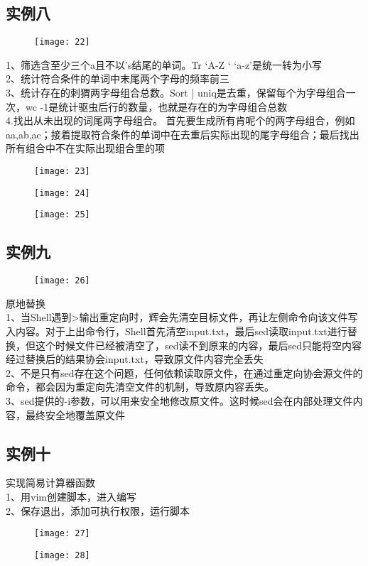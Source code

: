 \documentclass[12pt,letterpaper]{article}
\begin{document}
\subsection{实例八}
\begin{figure}[H]
\centering
\texttt{[image: 22]}
\end{figure}
1、筛选含至少三个a且不以’s结尾的单词。Tr ‘A-Z ‘ ‘a-z’是统一转为小写\\
2、统计符合条件的单词中末尾两个字母的频率前三\\
3、统计存在的刺猬两字母组合总数。Sort | uniq是去重，保留每个为字母组合一次，wc -1是统计驱虫后行的数量，也就是存在的为字母组合总数\\
4.找出从未出现的词尾两字母组合。
首先要生成所有肯呢个的两字母组合，例如aa,ab,ac；接着提取符合条件的单词中在去重后实际出现的尾字母组合；最后找出所有组合中不在实际出现组合里的项
\begin{figure}[H]
\centering
\texttt{[image: 23]}
\end{figure}
\vspace{-6mm}
\begin{figure}[H]
\centering
\texttt{[image: 24]}
\end{figure}
\vspace{-6mm}
\begin{figure}[H]
\centering
\texttt{[image: 25]}
\end{figure}

\subsection{实例九}
\begin{figure}[H]
\centering
\texttt{[image: 26]}
\end{figure}
原地替换\\
1、当Shell遇到>输出重定向时，辉会先清空目标文件，再让左侧命令向该文件写入内容。对于上出命令行，Shell首先清空input.txt，最后sed读取input.txt进行替换，但这个时候文件已经被清空了，sed读不到原来的内容，最后sed只能将空内容经过替换后的结果协会input.txt，导致原文件内容完全丢失\\
2、不是只有sed存在这个问题，任何依赖读取原文件，在通过重定向协会源文件的命令，都会因为重定向先清空文件的机制，导致原内容丢失。\\
3、sed提供的-i参数，可以用来安全地修改原文件。这时候sed会在内部处理文件内容，最终安全地覆盖原文件

\subsection{实例十}
实现简易计算器函数\\
1、用vim创建脚本，进入编写\\
2、保存退出，添加可执行权限，运行脚本
\begin{figure}[H]
\centering
\texttt{[image: 27]}
\end{figure}
\vspace{-6mm}
\begin{figure}[H]
\centering
\texttt{[image: 28]}
\end{figure}
\end{document}
